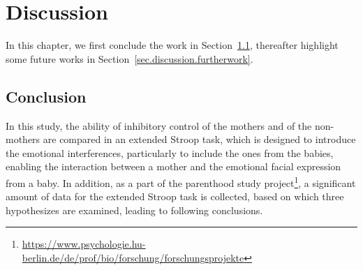 \chapter{Discussion}
\label{chp.discussion}


In this chapter, we first conclude the work in Section~\ref{sec.discussion.conclusion}, thereafter 
highlight some future works
in Section~\ref{sec.discussion.furtherwork}.

\section{Conclusion}\label{sec.discussion.conclusion}

In this study, the ability of inhibitory control of the 
mothers and of the non-mothers are 
compared in an extended Stroop task, 
which is designed to introduce the emotional
interferences, particularly to include the ones from the babies,
enabling the interaction between a mother and 
the emotional facial expression from a baby.
In addition, as a part of the 
parenthood study project\footnote{\url{https://www.psychologie.hu-berlin.de/de/prof/bio/forschung/forschungsprojekte}},
a significant amount of data for the extended Stroop task
is collected, based on which three hypothesizes are examined,
leading to following conclusions.

